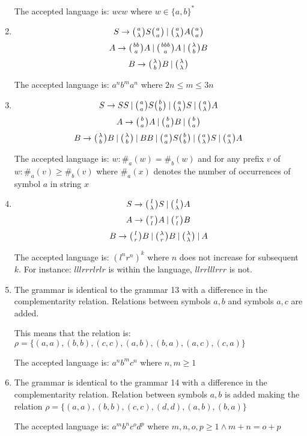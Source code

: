 \begin{enumerate}
{    The accepted language is: $wcw$ where $w \in \{a, b\}^*$
  }

  \item{
    $$S \rightarrow \wkpair{a}{\lambda} S \wkpair{a}{a} \:|\: \wkpair{a}{\lambda} A \wkpair{a}{a} $$
    $$A \rightarrow \wkpair{bb}{a} A \:|\: \wkpair{bbb}{a} A \:|\: \wkpair{\lambda}{b} B$$
    $$B \rightarrow \wkpair{\lambda}{b} B \:|\: \wkpair{\lambda}{\lambda}$$

    The accepted language is: $a^nb^ma^n$ where $2n \leq m \leq 3n$
  }

  \item{
    $$S \rightarrow S S \:|\: \wkpair{a}{a} S \wkpair{b}{b} \:|\: \wkpair{a}{\lambda} S \:|\: \wkpair{a}{\lambda} A$$
    $$A \rightarrow \wkpair{b}{a} A \:|\: \wkpair{b}{a} B \:|\: \wkpair{b}{a}$$
    $$B \rightarrow \wkpair{\lambda}{b} B \:|\: \wkpair{\lambda}{b} \:|\: B B \:|\: \wkpair{a}{a} S \wkpair{b}{b} \:|\: \wkpair{a}{\lambda} S \:|\: \wkpair{a}{\lambda} A$$

    The accepted language is: $w: \#_a(w) = \#_b(w)$ and for any prefix $v$ of $w: \#_a(v) \geq \#_b(v)$  where $\#_a(x)$ denotes the number of occurrences of symbol $a$ in string $x$
  }

  \item{
    $$S \rightarrow \wkpair{l}{\lambda} S \:|\: \wkpair{l}{\lambda} A$$
    $$A \rightarrow \wkpair{r}{l} A \:|\: \wkpair{r}{l} B$$
    $$B \rightarrow \wkpair{l}{r} B \:|\: \wkpair{\lambda}{r} B \:|\: \wkpair{\lambda}{\lambda} \:|\: A$$

    The accepted language is: $(l^n r^n)^k$ where $n$ does not increase for subsequent $k$. For instance: $lllrrrlrlr$ is within the language, $llrrlllrrr$ is not.
  }

  \item{
    The grammar is identical to the grammar 13 with a difference in the complementarity relation. Relations between symbols $a, b$ and symbols $a, c$ are added.

    This means that the relation is: $\rho = \{(a, a), (b, b), (c, c), (a, b), (b, a), (a, c), (c, a)\}$

    The accepted language is: $a^n b^m c^n$ where $n, m \geq 1$
  }

  \item{
	The grammar is identical to the grammar 14 with a difference in the complementarity relation. Relation between symbols $a, b$ is added making the relation $\rho = \{(a, a), (b, b), (c, c), (d, d), (a, b), (b, a)\}$

	The accepted language is: $a^m b^n c^o d^p$ where $m, n, o, p \geq 1 \wedge m+n = o+p$
  }


\end{enumerate}

